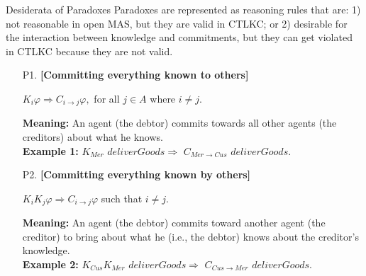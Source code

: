 \documentclass{beamer}
\begin{document}
\begin{frame}{Desiderata of Paradoxes}
Paradoxes are represented as reasoning rules that are: 1) not reasonable in
open MAS, but they are valid in CTLKC; or 2) desirable for the
interaction between knowledge and commitments, but they can get
violated in CTLKC because they are not valid.
 \begin{enumerate}

\vspace{0.2cm} \item [P1.]\textbf{[Committing everything known to
others]}

$K_i \varphi \Rightarrow C_{i \rightarrow j}\varphi, $ for all $j
\in A$ where $i \neq j$.

\textbf{ Meaning:} An agent (the debtor) commits towards all other
agents (the creditors) about what he knows.\\
\textbf{Example 1:}
$K_{Mer}$ $deliverGoods \Rightarrow$ $C_{Mer \rightarrow
Cus}$ $deliverGoods$.

\vspace{0.2cm} \item [P2.]\textbf{[Committing everything known by
others]}

 $ K_i K_j \varphi \Rightarrow C_{i \rightarrow j} \varphi$ such that $ i \neq j$.

\textbf{Meaning:} An agent (the debtor) commits toward another
agent (the creditor) to bring about what he (i.e., the debtor)
knows about the creditor's knowledge.\\
\textbf{Example 2:}
$K_{Cus} K_{Mer}$ $deliverGoods \Rightarrow$ $C_{Cus \rightarrow Mer}$
$deliverGoods$.


\end{enumerate}
       	
\end{frame}
\end{document}
